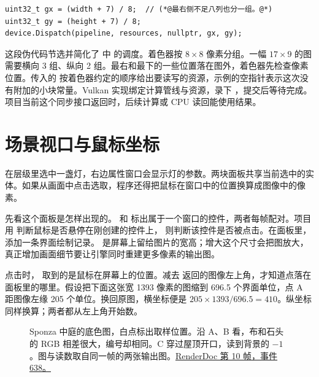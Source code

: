 \begin{lstlisting}
uint32_t gx = (width + 7) / 8;  // (*@最右侧不足八列也分一组。@*)
uint32_t gy = (height + 7) / 8;
device.Dispatch(pipeline, resources, nullptr, gx, gy);
\end{lstlisting}
这段伪代码节选并简化了  中  的调度。着色器按 $8\times8$ 像素分组。一幅 $17\times9$ 的图需要横向 3 组、纵向 2 组。最右和最下的一些位置落在图外，着色器先检查像素位置。传入的  按着色器约定的顺序给出要读写的资源，示例的空指针表示这次没有附加的小块常量。Vulkan 实现绑定计算管线与资源，录下 ，提交后等待完成。项目当前这个同步接口返回时，后续计算或 CPU 读回能使用结果。

\clearpage
\section{场景视口与鼠标坐标}
在层级里选中一盏灯，右边属性窗口会显示灯的参数。两块面板共享当前选中的实体。如果从画面中点击选取，程序还得把鼠标在窗口中的位置换算成图像中的像素。

先看这个面板是怎样出现的。 和  标出属于一个窗口的控件，两者每帧配对。项目用  判断鼠标是否悬停在刚创建的控件上， 则判断该控件是否被点击。在面板里， 添加一条界面绘制记录。 是屏幕上留给图片的宽高；增大这个尺寸会把图放大，真正增加画面细节要让引擎同时重建更多像素的输出图。

点击时， 取到的是鼠标在屏幕上的位置。减去  返回的图像左上角，才知道点落在面板里的哪里。假设把下面这张宽 1393 像素的图缩到 696.5 个界面单位，点 A 距图像左缘 205 个单位。换回原图，横坐标便是 $205\times1393/696.5=410$。纵坐标同样换算；两者都从左上角开始数。

\begin{figure}[H]\centering

\caption{Sponza 中庭的底色图，白点标出取样位置。沿 A、B 看，布和石头的 RGB 相差很大，编号却相同。C 穿过屋顶开口，读到背景的 $-1$。图与读数取自同一帧的两张输出图。\href{run:../../docs/latex/source-guide/figures/SOURCES.md}{RenderDoc 第 10 帧，事件 638。}}
\end{figure}

